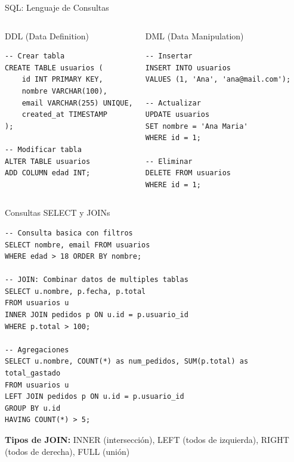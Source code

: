 \documentclass[aspectratio=169]{beamer}
\begin{document}
\begin{frame}[fragile]{SQL: Lenguaje de Consultas}
    \begin{columns}[t]
        \begin{block}{DDL (Data Definition)}
\begin{lstlisting}[style=sqlstyle]
-- Crear tabla
CREATE TABLE usuarios (
    id INT PRIMARY KEY,
    nombre VARCHAR(100),
    email VARCHAR(255) UNIQUE,
    created_at TIMESTAMP
);

-- Modificar tabla
ALTER TABLE usuarios
ADD COLUMN edad INT;
\end{lstlisting}
        \end{block}
        
        \begin{block}{DML (Data Manipulation)}
\begin{lstlisting}[style=sqlstyle]
-- Insertar
INSERT INTO usuarios 
VALUES (1, 'Ana', 'ana@mail.com');

-- Actualizar
UPDATE usuarios 
SET nombre = 'Ana Maria'
WHERE id = 1;

-- Eliminar
DELETE FROM usuarios 
WHERE id = 1;
\end{lstlisting}
        \end{block}
    \end{columns}
\end{frame}

\begin{frame}[fragile]{Consultas SELECT y JOINs}
\begin{lstlisting}[style=sqlstyle]
-- Consulta basica con filtros
SELECT nombre, email FROM usuarios 
WHERE edad > 18 ORDER BY nombre;

-- JOIN: Combinar datos de multiples tablas
SELECT u.nombre, p.fecha, p.total
FROM usuarios u
INNER JOIN pedidos p ON u.id = p.usuario_id
WHERE p.total > 100;

-- Agregaciones
SELECT u.nombre, COUNT(*) as num_pedidos, SUM(p.total) as total_gastado
FROM usuarios u
LEFT JOIN pedidos p ON u.id = p.usuario_id
GROUP BY u.id
HAVING COUNT(*) > 5;
\end{lstlisting}

\vspace{0.2cm}
\textbf{Tipos de JOIN:} INNER (intersección), LEFT (todos de izquierda), RIGHT (todos de derecha), FULL (unión)
\end{frame}
\end{document}
